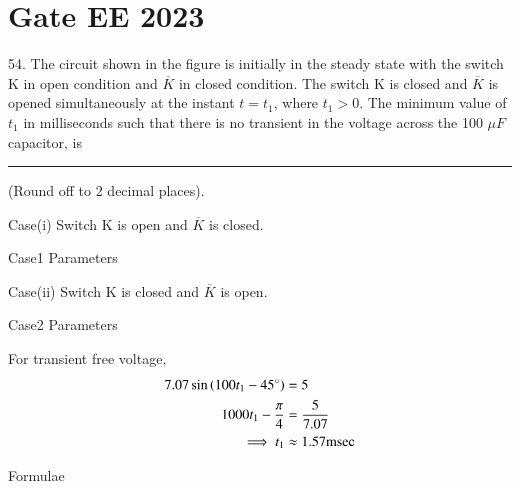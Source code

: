 \documentclass[journal,12pt,twocolumn]{IEEEtran}
\begin{document}


\vspace{3cm}

\title{}
\author{EE23BTECH11054 -  Sai Krishna Shanigarapu$^{*}$
}
\maketitle
\newpage
\bigskip


\section*{Gate EE 2023}
54. \hspace{2pt}The circuit shown in the figure is initially in the steady state with the switch K in open condition and $\overline{K}$ in closed condition. The switch K is closed and $\overline{K}$ is opened simultaneously at the instant $t = t_1$, where $t_1 > 0$. The minimum value of $t_1$ in milliseconds such that there is no transient in the voltage across the 100 $\mu F$ capacitor, is \rule{1cm}{0.15mm} (Round off to 2 decimal places).

\begin{figure}[h!]
  \centering
  \resizebox{0.8\columnwidth}{!}{}
\end{figure}

\solution

Case(i) Switch K is open and $\overline{K}$ is closed.
\begin{figure}[h!]
  \centering
  \resizebox{0.50\columnwidth}{!}{}
\end{figure}

\begin{table}[h!]
    
    \caption{Case1 Parameters}
    \label{tab:Gate.ee.54.1}
\end{table}

\newpage
Case(ii) Switch K is closed and $\overline{K}$ is open.

\begin{figure}[h!]
  \resizebox{0.55\columnwidth}{!}{}
\end{figure}

\begin{table}[ht]
    
    \caption{Case2 Parameters}
    \label{tab:Gate.ee.54.2}
\end{table}


For transient free voltage,
\begin{align}
    7.07\sin \left(100t_1 - 45^\circ\right) &= 5\\
    1000t_1 - \frac{\pi}{4} &= \frac{5}{7.07}\\
    \implies t_1 &\approx 1.57 \text{msec}
\end{align}

\begin{table}[ht]
    
    \caption{Formulae}
    \label{tab:Gate.ee.54.3}
\end{table}
\end{document}
